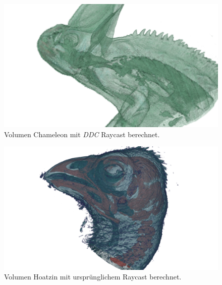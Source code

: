 \begin{landscape}
	\begin{figure}
		\centering
		\includegraphics[width=1\textheight]{../../Grafiken/results/picture_quality/chameleon/DDC_img-1_ray-1-5.png}
		\caption{Volumen Chameleon mit \emph{DDC} Raycast berechnet.}
		\label{fig::res::cam_ddc}
	\end{figure}
\end{landscape}


\begin{landscape}
	\begin{figure}
		\centering
		\includegraphics[width=1\textheight]{../../Grafiken/results/picture_quality/hoatzin/Standard_img-1_Ray-1-5.png}
		\caption{Volumen Hoatzin mit ursprünglichem Raycast berechnet.}
		\label{fig::res::hoa_st}
	\end{figure}
\end{landscape}


